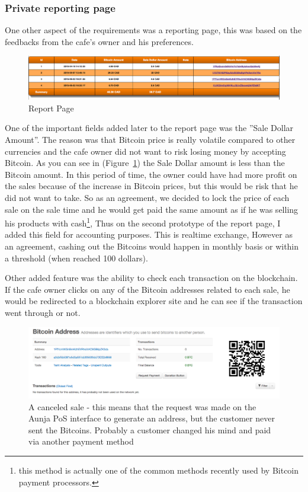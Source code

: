 \subsubsection{Private reporting page}
One other aspect of the requirements was a reporting page, this was based on the feedbacks from the cafe's owner and his preferences.

\begin{figure}[htb!p]
\centering
\includegraphics[width=\linewidth]{fig/report_page.png}
  \caption{Report Page}
\label{fig:report_page}
\end{figure}

One of the important fields added later to the report page was the ''Sale Dollar Amount''. The reason was that Bitcoin price is really volatile compared to other currencies and the cafe owner did not want to risk losing money by accepting Bitcoin. As you can see in (Figure~\ref{fig:report_page}) the Sale Dollar amount is less than the Bitcoin amount. In this period of time, the owner could have had more profit on the sales because of the increase in Bitcoin prices, but this would be risk that he did not want to take. So as an agreement, we decided to lock the price of each sale on the sale time and he would get paid the same amount as if he was selling his products with cash\footnote{this method is actually one of the common methods recently used by Bitcoin payment processors.}, Thus on the second prototype of the report page, I added this field for accounting purposes. This is realtime exchange, However as an agreement, cashing out the Bitcoins would happen in monthly basis or within a threshold (\eg when reached 100 dollars).

Other added feature was the ability to check each transaction on the blockchain. If the cafe owner clicks on any of the Bitcoin addresses related to each sale, he would be redirected to a blockchain explorer site and he can see if the transaction went through or not.

\begin{figure}[htb!p]
\centering
\includegraphics[width=\linewidth]{fig/canceled_sale.png}
  \caption{A canceled sale - this means that the request was made on the Aunja PoS interface to generate an address, but the customer never sent the Bitcoins. Probably a customer changed his mind and paid via another payment method}
\label{fig:canceled_sale}
\end{figure}


